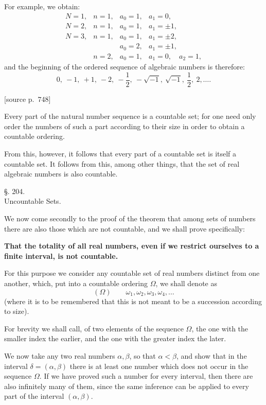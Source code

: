 \documentclass[11pt]{article}
\newcommand{\srcpage}[1]{\par\medskip\noindent\textsf{[source p.~#1]}\par\smallskip}
\begin{document}
For example, we obtain:
\[
\begin{array}{llll}
N=1, & n=1, & a_0=1, & a_1=0,\\
N=2, & n=1, & a_0=1, & a_1=\pm1,\\
N=3, & n=1, & a_0=1, & a_1=\pm2,\\
     &      & a_0=2, & a_1=\pm1,\\
     & n=2, & a_0=1, & a_1=0,\quad a_2=1,
\end{array}
\]
and the beginning of the ordered sequence of algebraic numbers is therefore:
\[
0,\ -1,\ +1,\ -2,\ -\frac12,\ -\sqrt{-1},\ \sqrt{-1},\ \frac12,\ 2,\ldots .
\]

\srcpage{748}
Every part of the natural number sequence is a countable set; for one need only order the numbers of such a part according to their size in order to obtain a countable ordering.

From this, however, it follows that every part of a countable set is itself a countable set. It follows from this, among other things, that the set of real algebraic numbers is also countable.

\begin{center}
{\large §. 204.}\\[0.4em]
{\large Uncountable Sets.}
\end{center}

We now come secondly to the proof of the theorem that among sets of numbers there are also those which are not countable, and we shall prove specifically:

\begin{center}
\textbf{That the totality of all real numbers, even if we restrict ourselves to a finite interval, is not countable.}
\end{center}

For this purpose we consider any countable set of real numbers distinct from one another, which, put into a countable ordering $\Omega$, we shall denote as
\[
(\Omega)\qquad \omega_1,\omega_2,\omega_3,\omega_4,\ldots
\]
(where it is to be remembered that this is not meant to be a succession according to size).

For brevity we shall call, of two elements of the sequence $\Omega$, the one with the smaller index the earlier, and the one with the greater index the later.

We now take any two real numbers $\alpha,\beta$, so that $\alpha<\beta$, and show that in the interval $\delta=(\alpha,\beta)$ there is at least one number which does not occur in the sequence $\Omega$. If we have proved such a number for every interval, then there are also infinitely many of them, since the same inference can be applied to every part of the interval $(\alpha,\beta)$.
\end{document}

